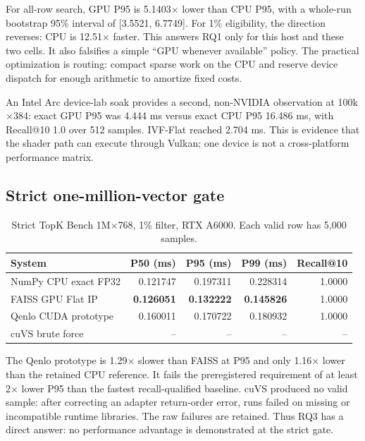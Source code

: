 \documentclass{article}
\begin{document}
For all-row search, GPU P95 is 5.1403$\times$ lower than CPU P95, with a whole-run bootstrap 95\%
interval of [3.5521, 6.7749]. For 1\% eligibility, the direction reverses: CPU is 12.51$\times$
faster. This answers RQ1 only for this host and these two cells. It also falsifies a simple
``GPU whenever available'' policy. The practical optimization is routing: compact sparse work on
the CPU and reserve device dispatch for enough arithmetic to amortize fixed costs.

An Intel Arc device-lab soak provides a second, non-NVIDIA observation at 100k$\times$384:
exact GPU P95 was 4.444 ms versus exact CPU P95 16.486 ms, with Recall@10 1.0 over 512 samples.
IVF-Flat reached 2.704 ms. This is evidence that the shader path can execute through Vulkan; one
device is not a cross-platform performance matrix.

\subsection{Strict one-million-vector gate}

\begin{table}[t]
\caption{Strict TopK Bench 1M$\times$768, 1\% filter, RTX A6000. Each valid row has 5,000 samples.}
\label{tab:a6000}
\centering
\small
\begin{tabular}{lrrrr}
\toprule
System & P50 (ms) & P95 (ms) & P99 (ms) & Recall@10 \\
\midrule
NumPy CPU exact FP32 & 0.121747 & 0.197311 & 0.228314 & 1.0000 \\
FAISS GPU Flat IP & \textbf{0.126051} & \textbf{0.132222} & \textbf{0.145826} & 1.0000 \\
Qenlo CUDA prototype & 0.160011 & 0.170722 & 0.180932 & 1.0000 \\
cuVS brute force & -- & -- & -- & -- \\
\bottomrule
\end{tabular}
\end{table}

The Qenlo prototype is 1.29$\times$ slower than FAISS at P95 and only 1.16$\times$ lower than the
retained CPU reference. It fails the preregistered requirement of at least 2$\times$ lower P95
than the fastest recall-qualified baseline. cuVS produced no valid sample: after correcting an
adapter return-order error, runs failed on missing or incompatible runtime libraries. The raw
failures are retained. Thus RQ3 has a direct answer: no performance advantage is demonstrated at
the strict gate.
\end{document}
